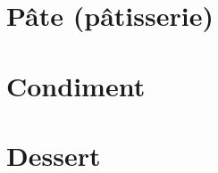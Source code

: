\documentclass[twosides, 11pt]{book}
\begin{document}
\maketitle
\tableofcontents
\chapter{Pâte (pâtisserie)}



\chapter{Condiment}


\chapter{Dessert}


\clearpage
\printindex
\end{document}
